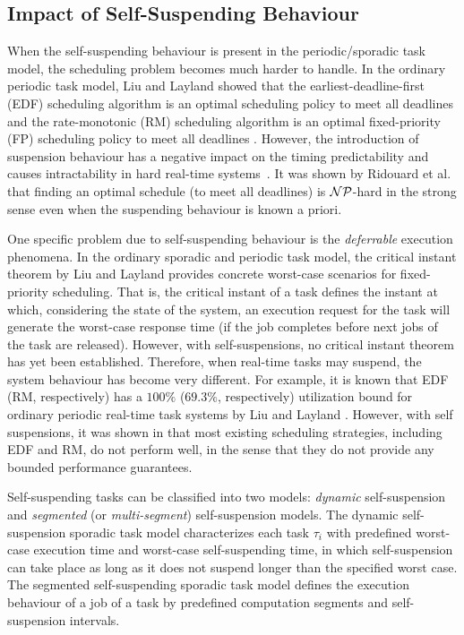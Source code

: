 \subsection{Impact of Self-Suspending Behaviour}

When the self-suspending behaviour is present in the periodic/sporadic task model, the scheduling problem becomes much harder to handle. In the ordinary periodic task model, Liu and Layland showed that the earliest-deadline-first (EDF) scheduling algorithm is an optimal scheduling policy to meet all deadlines and the rate-monotonic (RM) scheduling algorithm is an optimal fixed-priority (FP) scheduling policy to meet all deadlines \cite{Liu_1973}. However, the introduction of suspension behaviour has a negative impact on the timing predictability and causes intractability in hard real-time systems~\cite{Ridouard_2004}. It was shown by Ridouard et al. \cite{Ridouard_2004} that finding an optimal schedule (to meet all deadlines) is ${\cal NP}$-hard in the strong sense even when the suspending behaviour is known a priori.


One specific problem due to self-suspending behaviour is the \emph{deferrable} execution phenomena. In the ordinary sporadic and periodic task model, the critical instant theorem by Liu and Layland \cite{Liu_1973} provides concrete worst-case scenarios for fixed-priority scheduling.  That is, the critical instant of a task defines the instant at which, considering the state of the system, an execution request for the task will generate the worst-case response time (if the job completes before next jobs of the task are released).
However, with self-suspensions, no critical instant theorem has yet been established.
Therefore, when real-time tasks may suspend, the system behaviour has become very different. For example, it is known that EDF (RM, respectively) has a $100\%$ ($69.3\%$, respectively) utilization bound for ordinary periodic real-time task systems by Liu and Layland \cite{Liu_1973}. However, with self suspensions,  it was shown in \cite{Ridouard_2004,RTSS-ChenL14} that most existing scheduling strategies, including EDF and RM, do not perform well, in the sense that they do not provide any bounded performance guarantees. 

Self-suspending tasks can be classified into two models: \emph{dynamic} self-suspension and \emph{segmented} (or \emph{multi-segment}) self-suspension models.
The dynamic self-suspension sporadic task model characterizes each
task $\tau_i$ with predefined worst-case execution time and worst-case self-suspending time, in which self-suspension can take place as long as it does not suspend longer than the specified worst case. The segmented self-suspending sporadic task model defines the execution behaviour of a job of a task by predefined computation segments and self-suspension intervals.  

